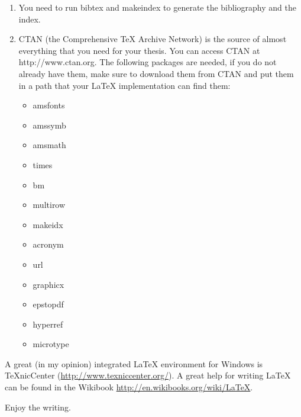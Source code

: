 \documentclass{article}
\begin{document}
\begin{enumerate}
\item You need to run bibtex and makeindex to generate the bibliography
and the index.

\item CTAN (the Comprehensive TeX Archive Network) is the source of
almost everything that you need for your thesis. You can access
CTAN at http://www.ctan.org. The following packages are needed,
if you do not already have them, make sure to download them from
CTAN and put them in a path that your LaTeX implementation can 
find them:

\begin{itemize}
	\item amsfonts
	\item amssymb
	\item amsmath
	\item times
	\item bm
	\item multirow
	\item makeidx
	\item acronym
	\item url
	\item graphicx
	\item epstopdf
	\item hyperref
	\item microtype
\end{itemize}

\end{enumerate}

A great (in my opinion) integrated {\LaTeX} environment for Windows is TeXnicCenter (\url{http://www.texniccenter.org/}). A great help for writing {\LaTeX} can be found in the Wikibook \url{http://en.wikibooks.org/wiki/LaTeX}. 

\vspace{+3em}
Enjoy the writing. 




\end{document}
